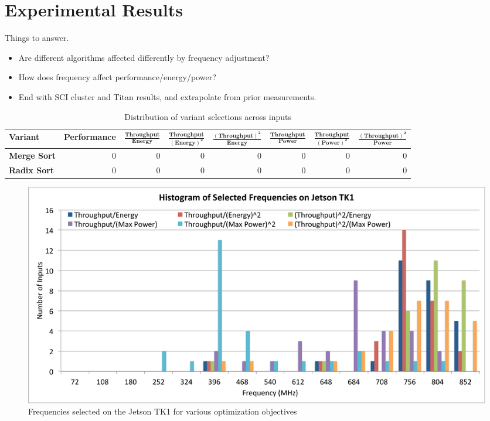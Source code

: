 \section{Experimental Results}

{\color{red} Things to answer.}
\begin{itemize}
\item Are different algorithms affected differently by frequency adjustment?
\item How does frequency affect performance/energy/power?
\item End with SCI cluster and Titan results, and extrapolate from prior 
measurements.
\end{itemize}


\begin{table}[tb]
  \begin{center}
  \begin{tabular}{| l | r | r | r | r | r | r | r |}
  \hline
  \textbf{Variant} & \textbf{Performance} & $\mathbf{\frac{Throughput}{Energy}}$ & $\mathbf{\frac{Throughput}{(Energy)^2}}$ & $\mathbf{\frac{(Throughput)^2}{Energy}}$ & $\mathbf{\frac{Throughput}{Power}}$ & $\mathbf{\frac{Throughput}{(Power)^2}}$ & $\mathbf{\frac{(Throughput)^2}{Power}}$ \\ \hline
  \textbf{Merge Sort} & 0 & 0 & 0 & 0 & 0 & 0 & 0 \\ \hline
  \textbf{Radix Sort} & 0 & 0 & 0 & 0 & 0 & 0 & 0 \\ \hline
  \end{tabular}
  \end{center}
  \caption{Distribution of variant selections across inputs}
  \label{tab:ss}
\end{table}

\begin{figure}[tb]
   \centering
   \includegraphics[scale=0.4]{figs/histo_tk1.pdf}
   \caption{Frequencies selected on the Jetson TK1 for various optimization objectives}
   \label{fig:histo-tk1}
\end{figure}

